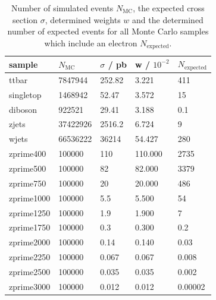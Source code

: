 \begin{table}[H]
  \centering
  \caption{Number of simulated events $N_\text{MC}$, the expected cross section $\sigma$, determined weights $w$ and the determined number of
  expected events for all Monte Carlo samples which include an electron $N_\text{expected}$.}
  \begin{tabular}{l|llll}
      sample           &  $N_\text{MC}$  & $\sigma$ / pb & w / $10^{-2}$ & $N_\text{expected}$ \\
      \hline
      ttbar      & 7847944    & 252.82    &    3.221   &     411       \\
      singletop  & 1468942    & 52.47     &    3.572   &     15       \\
      diboson    & 922521     & 29.41     &    3.188   &         0.1       \\
      zjets      & 37422926   & 2516.2    &    6.724   &     9       \\
      wjets      & 66536222   & 36214     &   54.427   &     280       \\
      zprime400  & 100000     & 110       &  110.000   &     2735       \\
      zprime500  & 100000     & 82        &   82.000   &     3379       \\
      zprime750  & 100000     & 20        &   20.000   &     486       \\
      zprime1000 & 100000     & 5.5       &    5.500   &     54       \\
      zprime1250 & 100000     & 1.9       &    1.900   &     7       \\
      zprime1750 & 100000     & 0.3       &    0.300   &     0.2       \\
      zprime2000 & 100000     & 0.14      &    0.140   &     0.03       \\
      zprime2250 & 100000     & 0.067     &    0.067   &     0.008       \\
      zprime2500 & 100000     & 0.035     &    0.035   &     0.002       \\
      zprime3000 & 100000     & 0.012     &    0.012   &     0.00002       \\
      \end{tabular}
\label{tab:agree}

  \end{table}

